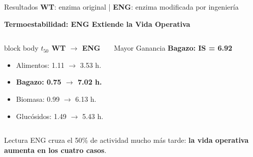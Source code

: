 \begin{frame}[label=resultados]{Resultados \hfill{\tiny\color{TextoSuave}\textbf{WT}: enzima original \quad | \quad \textbf{ENG}: enzima modificada por ingeniería}}



{\color{Cian}\bfseries Termoestabilidad: ENG Extiende la Vida Operativa}\par
\vspace{0.06cm}

\begin{columns}[T,onlytextwidth]

\begin{beamercolorbox}[wd=\linewidth,sep=0.12cm,rounded=true]{block body}
\small
\textbf{$t_{50}$ WT $\rightarrow$ ENG}
\begin{itemize}
\item Alimentos: 1.11 $\rightarrow$ 3.53 h.
\item \textbf{Bagazo: 0.75 $\rightarrow$ 7.02 h.}
\item Biomasa: 0.99 $\rightarrow$ 6.13 h.
\item Glucósidos: 1.49 $\rightarrow$ 5.43 h.
\end{itemize}
\end{beamercolorbox}

\vspace{0.08cm}
\begin{alertblock}{Mayor Ganancia}
\centering\small\bfseries
Bagazo: IS = 6.92
\end{alertblock}
\end{columns}

\vspace{0.07cm}
\begin{block}{Lectura}
\centering\small
ENG cruza el 50\% de actividad mucho más tarde: \textbf{la vida operativa aumenta en los cuatro casos}.
\end{block}
\end{frame}
